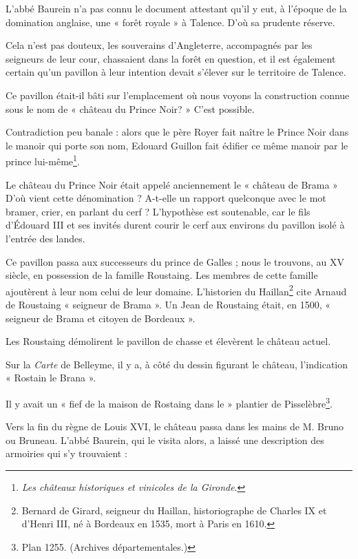 L'abbé Baurein n'a pas connu le document attestant qu'il y eut, à l'époque de la domination anglaise, une « forêt royale » à Talence. D'où sa prudente réserve.

Cela n'est pas douteux, les souverains d'Angleterre, accompagnés par les seigneurs de leur cour, chassaient dans la forêt en question, et il est également certain qu'un pavillon à leur intention devait s'élever sur le territoire de Talence.

Ce pavillon était-il bâti sur l'emplacement où nous voyons la construction connue sous le nom de « château du Prince Noir? » C'est possible.

Contradiction peu banale : alors que le père Royer fait naître le Prince Noir dans le manoir qui porte son nom, Edouard Guillon fait édifier ce même manoir par le prince lui-même\footnote{\textit{Les châteaux historiques et vinicoles de la Gironde}.}.

Le château du Prince Noir était appelé anciennement le « château de Brama » D'où vient cette dénomination ? A-t-elle un rapport quelconque avec le mot bramer, crier, en parlant du cerf ? L'hypothèse est soutenable, car le fils d'Édouard III et ses invités durent courir le cerf aux environs du pavillon isolé à l'entrée des landes.

Ce pavillon passa aux successeurs du prince de Galles ; nous le trouvons, au XV\ieme{} siècle, en possession de la famille Roustaing. Les membres de cette famille ajoutèrent à leur nom celui de leur domaine. L'historien du Haillan\footnote{Bernard de Girard, seigneur du Haillan, historiographe de Charles IX et d'Henri III, né à Bordeaux en 1535, mort à Paris en 1610.} cite Arnaud de Roustaing « seigneur de Brama ». Un Jean de Roustaing était, en 1500, « seigneur de Brama et citoyen de Bordeaux ».

Les Roustaing démolirent le pavillon de chasse et élevèrent le château actuel.

Sur la \textit{Carte} de Belleyme, il y a, à côté du dessin figurant le château, l'indication « Rostain le Brana ».

Il y avait un « fief de la maison de Rostaing dans le » plantier de Pisselèbre\footnote{Plan 1255. (Archives départementales.)}.

\asterism{}

Vers la fin du règne de Louis XVI, le château passa dans les mains de M. Bruno ou Bruneau. L'abbé Baurein, qui le visita alors, a laissé une description des armoiries qui s'y trouvaient :

